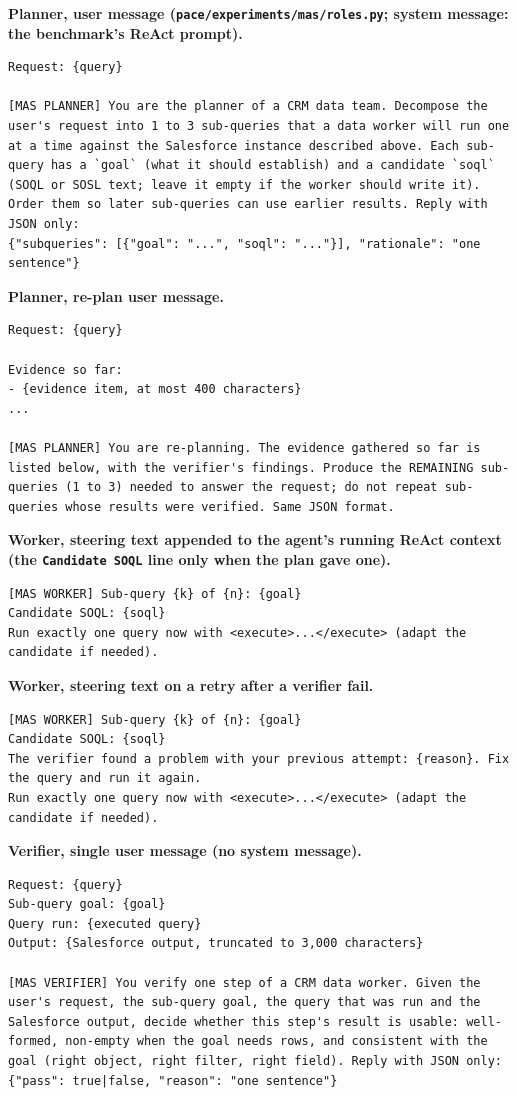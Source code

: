 \documentclass[10pt]{article}
\newcommand{\code}[1]{\texttt{#1}}
\newcommand{\prompttitle}[1]{\par\vspace{7pt}\noindent\textbf{#1}\par\nopagebreak\vspace{3pt}}
\begin{document}
\prompttitle{Planner, user message (\code{pace/experiments/mas/roles.py}; system message: the benchmark's ReAct prompt).}
\begin{lstlisting}
Request: {query}

[MAS PLANNER] You are the planner of a CRM data team. Decompose the user's request into 1 to 3 sub-queries that a data worker will run one at a time against the Salesforce instance described above. Each sub-query has a `goal` (what it should establish) and a candidate `soql` (SOQL or SOSL text; leave it empty if the worker should write it). Order them so later sub-queries can use earlier results. Reply with JSON only:
{"subqueries": [{"goal": "...", "soql": "..."}], "rationale": "one sentence"}
\end{lstlisting}

\prompttitle{Planner, re-plan user message.}
\begin{lstlisting}
Request: {query}

Evidence so far:
- {evidence item, at most 400 characters}
...

[MAS PLANNER] You are re-planning. The evidence gathered so far is listed below, with the verifier's findings. Produce the REMAINING sub-queries (1 to 3) needed to answer the request; do not repeat sub-queries whose results were verified. Same JSON format.
\end{lstlisting}

\prompttitle{Worker, steering text appended to the agent's running ReAct context (the \code{Candidate SOQL} line only when the plan gave one).}
\begin{lstlisting}
[MAS WORKER] Sub-query {k} of {n}: {goal}
Candidate SOQL: {soql}
Run exactly one query now with <execute>...</execute> (adapt the candidate if needed).
\end{lstlisting}

\prompttitle{Worker, steering text on a retry after a verifier fail.}
\begin{lstlisting}
[MAS WORKER] Sub-query {k} of {n}: {goal}
Candidate SOQL: {soql}
The verifier found a problem with your previous attempt: {reason}. Fix the query and run it again.
Run exactly one query now with <execute>...</execute> (adapt the candidate if needed).
\end{lstlisting}

\prompttitle{Verifier, single user message (no system message).}
\begin{lstlisting}
Request: {query}
Sub-query goal: {goal}
Query run: {executed query}
Output: {Salesforce output, truncated to 3,000 characters}

[MAS VERIFIER] You verify one step of a CRM data worker. Given the user's request, the sub-query goal, the query that was run and the Salesforce output, decide whether this step's result is usable: well-formed, non-empty when the goal needs rows, and consistent with the goal (right object, right filter, right field). Reply with JSON only: {"pass": true|false, "reason": "one sentence"}
\end{lstlisting}
\end{document}
